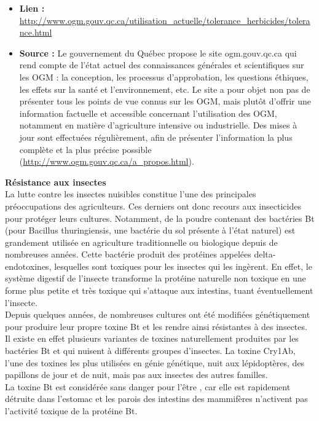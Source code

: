 \documentclass[8pt]{article}
\begin{document}
\begin{itemize}
	\item \textbf{Lien : }  \url{http://www.ogm.gouv.qc.ca/utilisation_actuelle/tolerance_herbicides/tolerance.html}
	\item \textbf{Source : } Le gouvernement du Québec propose le site ogm.gouv.qc.ca qui rend compte de l’état actuel des connaissances générales et scientifiques sur les OGM : la conception, les processus d’approbation, les questions éthiques, les effets sur la santé et l’environnement, etc. Le site a pour objet non pas de présenter tous les points de vue connus sur les OGM, mais plutôt d’offrir une information factuelle et accessible concernant l’utilisation des OGM, notamment en matière d’agriculture intensive ou industrielle. Des mises à jour sont effectuées régulièrement, afin de présenter l’information la plus complète et la plus précise possible (\url{http://www.ogm.gouv.qc.ca/a_propos.html}).
\end{itemize}

\textbf{Résistance aux insectes}\\

La lutte contre les insectes nuisibles constitue l’une des principales préoccupations des agriculteurs. Ces derniers ont donc recours aux insecticides pour protéger leurs cultures. Notamment, de la poudre contenant des bactéries Bt (pour Bacillus thuringiensis, une bactérie du sol présente à l’état naturel) est grandement utilisée en agriculture traditionnelle ou biologique depuis de nombreuses années. Cette bactérie produit des protéines appelées delta-endotoxines, lesquelles sont toxiques pour les insectes qui les ingèrent. En effet, le système digestif de l’insecte transforme la protéine naturelle non toxique en une forme plus petite et très toxique qui s’attaque aux intestins, tuant éventuellement l’insecte. \\

Depuis quelques années, de nombreuses cultures ont été modifiées génétiquement pour produire leur propre toxine Bt et les rendre ainsi résistantes à des insectes. Il existe en effet plusieurs variantes de toxines naturellement produites par les bactéries Bt et qui nuisent à différents groupes d’insectes. La toxine Cry1Ab, l’une des toxines les plus utilisées en génie génétique, nuit aux lépidoptères, des papillons de jour et de nuit, mais pas aux insectes des autres familles. \\

La toxine Bt est considérée sans danger pour l’être , car elle est rapidement détruite dans l’estomac et les parois des intestins des mammifères n’activent pas l’activité toxique de la protéine Bt.\\
\end{document}

